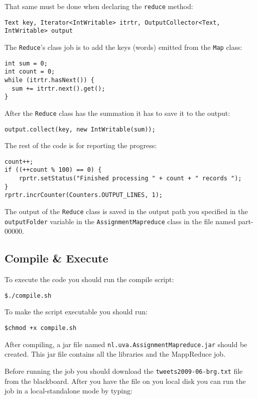 \documentclass[a4paper,10pt]{article}
\begin{document}
That same must be done when declaring the \texttt{reduce} method:
\begin{lstlisting}
Text key, Iterator<IntWritable> itrtr, OutputCollector<Text, IntWritable> output
\end{lstlisting}


The \texttt{Reduce}'s class job is to add the keys (words) emitted from the \texttt{Map} class: 
\begin{lstlisting}
int sum = 0;
int count = 0;
while (itrtr.hasNext()) {
  sum += itrtr.next().get();
}
\end{lstlisting}


After the \texttt{Reduce} class has the summation it has to save it to the output: 

\begin{lstlisting}
output.collect(key, new IntWritable(sum));
\end{lstlisting}


The rest of the code is for reporting the progress:

\begin{lstlisting}
count++;
if ((++count % 100) == 0) {
    rprtr.setStatus("Finished processing " + count + " records ");
}
rprtr.incrCounter(Counters.OUTPUT_LINES, 1);
\end{lstlisting}

The output of the \texttt{Reduce} class is saved in the output path you specified in the \texttt{outputFolder} variable in the \texttt{AssignmentMapreduce} class in the file named part-00000. 

\subsection{Compile \& Execute}

To execute the code you should run the compile script:
\lstset{language=}
\begin{lstlisting}
$./compile.sh 
\end{lstlisting}

To make the script executable you should run:
\begin{lstlisting}
$chmod +x compile.sh
\end{lstlisting}

After compiling, a jar file named \texttt{nl.uva.AssignmentMapreduce.jar} should be created. This jar file contains all the libraries and the MappReduce job. 

Before running the job you should download the \texttt{tweets2009-06-brg.txt} file from the blackboard. 
After you have the file on you local disk you can run the job in a local-standalone mode by typing:
\end{document}
